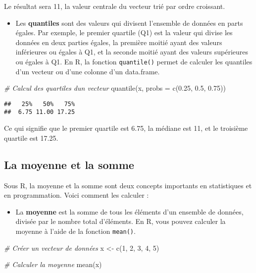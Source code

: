 \documentclass[
]{article}
\newenvironment{Shaded}{\begin{snugshade}}{\end{snugshade}}
\newcommand{\AttributeTok}[1]{\textcolor[rgb]{0.77,0.63,0.00}{#1}}
\newcommand{\CommentTok}[1]{\textcolor[rgb]{0.56,0.35,0.01}{\textit{#1}}}
\newcommand{\DecValTok}[1]{\textcolor[rgb]{0.00,0.00,0.81}{#1}}
\newcommand{\FloatTok}[1]{\textcolor[rgb]{0.00,0.00,0.81}{#1}}
\newcommand{\FunctionTok}[1]{\textcolor[rgb]{0.00,0.00,0.00}{#1}}
\newcommand{\NormalTok}[1]{#1}
\newcommand{\OtherTok}[1]{\textcolor[rgb]{0.56,0.35,0.01}{#1}}
\providecommand{\tightlist}{%
  \setlength{\itemsep}{0pt}\setlength{\parskip}{0pt}}
\begin{document}
Le résultat sera 11, la valeur centrale du vecteur trié par ordre croissant.

\begin{itemize}
\tightlist
\item
  Les \textbf{quantiles} sont des valeurs qui divisent l'ensemble de données en parts égales. Par exemple, le premier quartile (Q1) est la valeur qui divise les données en deux parties égales, la première moitié ayant des valeurs inférieures ou égales à Q1, et la seconde moitié ayant des valeurs supérieures ou égales à Q1. En R, la fonction \texttt{quantile()} permet de calculer les quantiles d'un vecteur ou d'une colonne d'un data.frame.
\end{itemize}

\begin{Shaded}
\begin{Highlighting}[]
\CommentTok{\# Calcul des quartiles d\textquotesingle{}un vecteur}
\FunctionTok{quantile}\NormalTok{(x, }\AttributeTok{probs =} \FunctionTok{c}\NormalTok{(}\FloatTok{0.25}\NormalTok{, }\FloatTok{0.5}\NormalTok{, }\FloatTok{0.75}\NormalTok{))}
\end{Highlighting}
\end{Shaded}

\begin{verbatim}
##   25%   50%   75% 
##  6.75 11.00 17.25
\end{verbatim}

Ce qui signifie que le premier quartile est 6.75, la médiane est 11, et le troisième quartile est 17.25.

\hypertarget{la-moyenne-et-la-somme}{%
\subsection{La moyenne et la somme}\label{la-moyenne-et-la-somme}}

Sous R, la moyenne et la somme sont deux concepts importants en statistiques et en programmation. Voici comment les calculer :

\begin{itemize}
\tightlist
\item
  La \textbf{moyenne} est la somme de tous les éléments d'un ensemble de données, divisée par le nombre total d'éléments. En R, vous pouvez calculer la moyenne à l'aide de la fonction \texttt{mean()}.
\end{itemize}

\begin{Shaded}
\begin{Highlighting}[]
\CommentTok{\# Créer un vecteur de données}
\NormalTok{x }\OtherTok{\textless{}{-}} \FunctionTok{c}\NormalTok{(}\DecValTok{1}\NormalTok{, }\DecValTok{2}\NormalTok{, }\DecValTok{3}\NormalTok{, }\DecValTok{4}\NormalTok{, }\DecValTok{5}\NormalTok{)}

\CommentTok{\# Calculer la moyenne}
\FunctionTok{mean}\NormalTok{(x)}
\end{Highlighting}
\end{Shaded}
\end{document}

